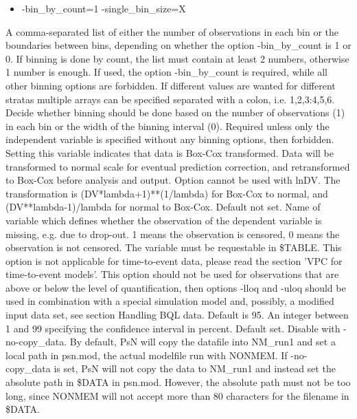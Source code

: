 \begin{optionlist}
\begin{itemize}
	\item -bin\_by\_count=1 -single\_bin\_size=X
\end{itemize}
A comma-separated list of either the number of observations in each bin or the boundaries between bins, depending on whether the option 
-bin\_by\_count is 1 or 0. If binning is done by count, the list must contain at least 2 numbers, otherwise 1 number is enough.
If used, the option -bin\_by\_count is required, while all other binning options are forbidden. If different values are wanted for
different stratas multiple arrays can be specified separated with a colon, i.e. 1,2,3:4,5,6.
\nextopt
{}
Decide whether binning should be done based on the number of observations (1) in each bin or the width of the binning interval (0).
Required unless only the independent variable is specified without any binning options, then forbidden.
\nextopt
{}
Setting this variable indicates that data is Box-Cox transformed. Data will be transformed to normal scale for eventual prediction correction, and retransformed to Box-Cox before analysis and output. Option cannot be used with lnDV. The transformation is (DV*lambda+1)**(1/lambda) for Box-Cox to normal, and (DV**lambda-1)/lambda for normal to Box-Cox. 
\nextopt
{}
Default not set. Name of variable which defines whether the observation of the dependent variable is missing, e.g. due to drop-out. 1 means the observation is censored, 0 means the observation is not censored. The variable must be requestable in \$TABLE. This option is not applicable for time-to-event data, please read the section 'VPC for time-to-event models'. This option should not be used for observations that are above or below the level of quantification, then options \mbox{-lloq} and -uloq should be used in combination with a special simulation model and, possibly, a modified input data set, see section Handling BQL data.  
\nextopt
{}
Default is 95. An integer between 1 and 99 specifying the confidence interval in percent.
\nextopt
{}
Default set. Disable with -no-copy\_data. By default, PsN will copy the datafile into NM\_run1 and set a local path in psn.mod, the actual modelfile run with NONMEM. If -no-copy\_data is set, PsN will not copy the data to NM\_run1 and instead set the absolute path in \$DATA in psn.mod. However, 
the absolute path must not be too long, since NONMEM will not accept more than 80 characters for the filename in \$DATA.  
\nextopt

\end{optionlist}
